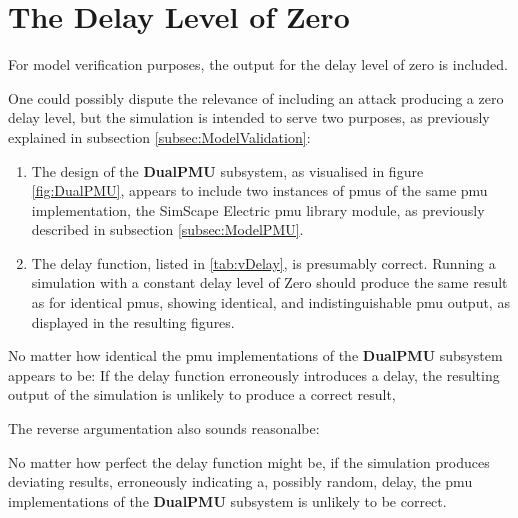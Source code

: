 \begin{figure}[H]

\label{fig:VoltageZeroDelay}
\end{figure}


\section{The Delay Level of Zero}
For model verification purposes, the output for the delay level of zero is included.

One could possibly dispute the relevance of including an attack producing a zero delay level, but the simulation is intended to serve two purposes, as previously explained in subsection \ref{subsec:ModelValidation}:

\begin{enumerate}
\item The design of the \textbf{DualPMU}  subsystem, as visualised in figure \ref{fig:DualPMU}, appears to include two instances of \acrlong{pmu}s of the same \acrshort{pmu} implementation, the SimScape Electric \acrshort{pmu} library module, as previously described in subsection \ref{subsec:ModelPMU}.  
\item The delay function, listed in \ref{tab:vDelay}, is presumably correct. Running a simulation with a constant delay level of Zero should produce the same result as for identical \acrfull{pmu}s, showing identical, and indistinguishable \acrshort{pmu} output, as displayed in the resulting figures.
\end{enumerate}

No matter how identical the \acrshort{pmu} implementations of the  \textbf{DualPMU}  subsystem appears to be: If the delay function erroneously introduces a delay, the resulting output of the simulation is unlikely to produce a correct result, 

The reverse argumentation also sounds reasonalbe:

No matter how perfect the delay function might be, if the simulation produces deviating results, erroneously indicating a, possibly random, delay, the \acrshort{pmu} implementations of the  \textbf{DualPMU}  subsystem  is unlikely to be correct. 

